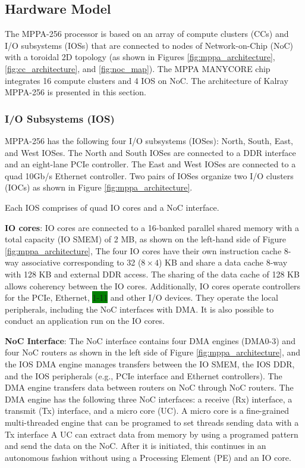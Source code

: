 \documentclass[conference,compsoc]{IEEEtran}
\begin{document}
\subsection{Hardware Model}
\label{sec:hardware_model}
The MPPA-256 processor is based on an array of compute clusters (CCs) and I/O subsystems (IOSs) that are connected to nodes of Network-on-Chip (NoC) with a toroidal 2D topology 
(as shown in Figures \ref{fig:mppa_architecture}, \ref{fig:cc_architecture}, and \ref{fig:noc_map}).
The MPPA MANYCORE chip integrates 16 compute clusters and 4 IOS on NoC.
The architecture of Kalray MPPA-256 is presented in this section.

\subsubsection{I/O Subsystems (IOS)}
\label{sec:ios}
MPPA-256 has the following four I/O subsystems (IOSes): North, South, East, and West IOSes.
The North and South IOSes are connected to a DDR interface and an eight-lane PCIe controller.
The East and West IOSes are connected to a quad 10Gb/s Ethernet controller.
Two pairs of IOSes organize two I/O clusters (IOCs) as shown in Figure \ref{fig:mppa_architecture}.

Each IOS comprises of quad IO cores and a NoC interface.

\textbf{IO cores}: IO cores are connected to a 16-banked parallel shared memory with a total capacity (IO SMEM) of 2 MB, as shown on the left-hand side of Figure \ref{fig:mppa_architecture},
The four IO cores have their own instruction cache 8-way associative corresponding to 32 ($8 \times 4$) KB and share a data cache 8-way with 128 KB and external DDR access.
The sharing of the data cache of 128 KB allows coherency between the IO cores.
Additionally, IO cores operate controllers for the PCIe, Ethernet, \colorbox{green}{1-11} and other I/O devices.
They operate the local peripherals, including the NoC interfaces with DMA.
It is also possible to conduct an application run on the IO cores.

\textbf{NoC Interface}: The NoC interface contains four DMA engines (DMA0-3) and four NoC routers as shown in the left side of Figure \ref{fig:mppa_architecture}, and the IOS DMA engine manages transfers between the IO SMEM, the IOS DDR, and the IOS peripherals (e.g., PCIe interface and Ethernet controllers).
The DMA engine transfers data between routers on NoC through NoC routers.
The DMA engine has the following three NoC interfaces: a receive (Rx) interface, a transmit (Tx) interface, and a micro core (UC).
A micro core is a fine-grained multi-threaded engine that can be programed to set threads sending data with a Tx interface
A UC can extract data from memory by using a programed pattern and send the data on the NoC.
After it is initiated, this continues in an autonomous fashion without using a Processing Element (PE) and an IO core.
\end{document}
